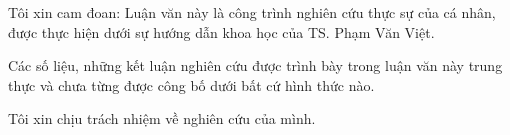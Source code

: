 Tôi xin cam đoan: Luận văn này là công trình nghiên cứu thực sự của cá nhân, được thực hiện dưới sự hướng dẫn khoa học của TS. Phạm Văn Việt. 

Các số liệu, những kết luận nghiên cứu được trình bày trong luận văn này trung thực và chưa từng được công bố dưới bất cứ hình thức nào.

Tôi xin chịu trách nhiệm về nghiên cứu của mình.


